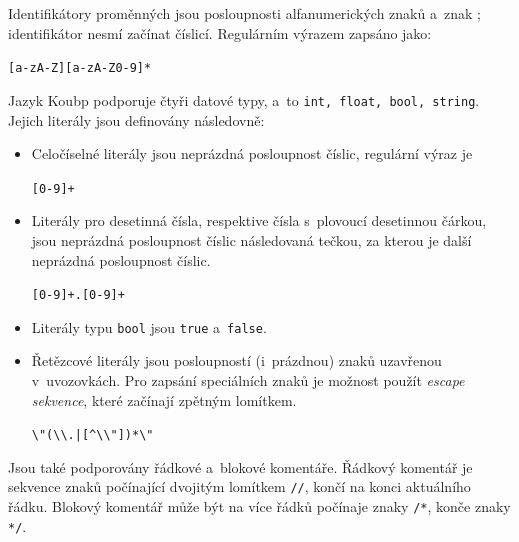 Identifikátory proměnných jsou posloupnosti alfanumerických znaků a~znak \texttt{\textunderscore}; identifikátor nesmí začínat číslicí.
Regulárním výrazem zapsáno jako:
\begin{center}
    \texttt{[a-zA-Z\textunderscore][a-zA-Z0-9\textunderscore]*}
\end{center}

Jazyk Koubp podporuje čtyři datové typy, a~to \texttt{int, float, bool, string}.
Jejich literály jsou definovány následovně:
\begin{itemize}
    \item Celočíselné literály jsou neprázdná posloupnost číslic, regulární výraz je
    \begin{center}
        \texttt{[0-9]+}
    \end{center} 
    \item Literály pro desetinná čísla, respektive čísla s~plovoucí desetinnou čárkou, jsou neprázdná posloupnost číslic následovaná tečkou, za kterou je další neprázdná posloupnost číslic.
    \begin{center}
        \texttt{[0-9]+.[0-9]+}
    \end{center}
    \item Literály typu \texttt{bool} jsou \texttt{true} a~\texttt{false}.
    \item Řetězcové literály jsou posloupností (i~prázdnou) znaků uzavřenou v~uvozovkách.
    Pro zapsání speciálních znaků je možnost použít \emph{escape sekvence}, které začínají zpětným lomítkem.
    \begin{center}
        \texttt{\textbackslash"(\textbackslash\textbackslash.|[\^{}\textbackslash\textbackslash"])*\textbackslash"}
    \end{center}
\end{itemize}

Jsou také podporovány řádkové a~blokové komentáře.
Řádkový komentář je sekvence znaků počínající dvojitým lomítkem \texttt{//}, končí na konci aktuálního řádku.
Blokový komentář může být na více řádků počínaje znaky \texttt{/*}, konče znaky \texttt{*/}.

